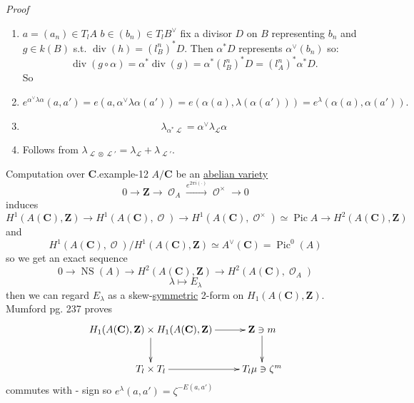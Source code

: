 \documentclass[10pt,]{book}
\makeatletter
\renewcommand*{\proofname}{Proof}
\renewenvironment{proof}[1][\proofname]{\par
  \pushQED{\qed}%
  \normalfont \topsep6\p@\@plus6\p@\relax
  \trivlist
  \item\relax
    {\itshape
    #1\@addpunct{.}}\hspace\labelsep\ignorespaces
}{%
  \popQED\endtrivlist\@endpefalse
}
\numberwithin{equation}{section}
\newcommand{\sheaf}[1]{\operatorname{\mathcal{#1}}}
\newcommand{\ZZ}{\mathbf{Z}}
\newcommand{\CC}{\mathbf{C}}
\DeclareMathOperator{\divisor}{div}
\DeclareMathOperator{\Pic}{Pic}
\DeclareMathOperator{\NS}{NS}
\makeatother
\begin{document}
\begin{proof}\hypertarget{proof-49}{}
\hypertarget{p-307}{}%
\leavevmode%
\begin{enumerate}
\item\hypertarget{li-52}{}\(a = (a_n) \in T_lA\) \(b\in (b_n) \in T_l B^\vee\) fix a divisor \(D \) on \(B\) representing \(b_n\) and \(g\in k(B)\) s.t. \(\divisor (h) = (l^n_B)^* D\). Then \(\alpha^* D\) represents \(\alpha^\vee(b_n)\) so:%
\begin{equation*}
\divisor(g\circ \alpha) = \alpha^*\divisor (g) = \alpha^*(l^n_B)^* D = (l_A^n)^* \alpha^* D\text{.}
\end{equation*}
So%
\item\hypertarget{li-53}{}%
\begin{equation*}
e^{\alpha^{\vee}\lambda \alpha} (a,a') = e(a, \alpha^\vee\lambda \alpha(a')) = e(\alpha(a),\lambda (\alpha(a'))) = e^\lambda (\alpha(a), \alpha(a'))\text{.}
\end{equation*}
%
\item\hypertarget{li-54}{}%
\begin{equation*}
\lambda_{\alpha^* \sheaf L} = \alpha^\vee \lambda_{\sheaf L} \alpha
\end{equation*}
%
\item\hypertarget{li-55}{}Follows from \(\lambda_{\sheaf L\otimes \sheaf L'} = \lambda_{\sheaf L} + \lambda_{\sheaf L'}\).%
\end{enumerate}
%
\end{proof}
\begin{example}{Computation over \(\CC\).}{example-12}%
\hypertarget{p-308}{}%
\(A/\CC\) be an \hyperref[def-buntes-abvar]{abelian variety}%
\begin{equation*}
0\to \ZZ \to \sheaf O_A \xrightarrow{e^{2\pi i (\cdot)}} \sheaf O^\times \to 0
\end{equation*}
induces%
\begin{equation*}
H^1(A(\CC), \ZZ) \to H^1(A(\CC), \sheaf O) \to H^1(A(\CC), \sheaf O^\times) \simeq \Pic A \to H^2(A(\CC), \ZZ)
\end{equation*}
and%
\begin{equation*}
H^1(A(\CC), \sheaf O)/ H^1(A(\CC), \ZZ) \simeq A^\vee(\CC) = \Pic^0(A)
\end{equation*}
so we get an exact sequence%
\begin{equation*}
0 \to \NS(A) \to H^2 (A(\CC),\ZZ) \to H^2(A(\CC),\sheaf O_A)
\end{equation*}
%
\begin{equation*}
\lambda \mapsto E_\lambda
\end{equation*}
then we can regard \(E_\lambda\) as a skew-\hyperref[def-princ-pol]{symmetric} 2-form on \(H_1(A(\CC), \ZZ)\). Mumford pg. 237 proves%
\begin{equation*}
\xymatrix{
H_1(A(\CC), \ZZ) \times H_1(A(\CC), \ZZ) \ar[r] \ar[d] & \ZZ\ni m \ar[d] \\
T_l \times T_l \ar[r] & T_l \mu \ni \zeta^m
}
\end{equation*}
commutes with - sign so \(e^\lambda (a,a') = \zeta^{-E(a,a')}\)%
\end{example}
\end{document}
